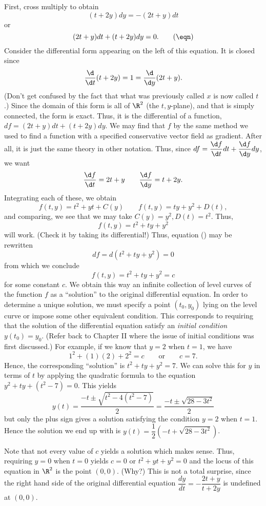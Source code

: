 First, cross multiply to obtain
$$
  (t + 2y)dy = -(2t + y)dt
$$
or
\nexteqn
$$
  (2t + y)dt + (t + 2y)dy = 0.\tag\eqn
$$
Consider the differential form appearing on the left of this
equation.  It is closed since
$$
\frac{\d}{\d t} (t + 2y) = 1 = \frac{\d}{\d y}(2t + y).
$$
(Don't get confused by the fact that what was previously called
$x$ is now called $t$.)  Since the domain of this form is all
of $\R^2$ (the $t,y$-plane), and that is simply connected, the form
is exact.  Thus, it is the differential of a function,
 $df = (2t + y)dt + (t + 2y)dy$.  We may find that
$f$ by the same method we used to find a function 
with a specified 
 conservative vector field as gradient.  After all, it is just
the same theory in other notation.  Thus, since
$df = \dfrac{\d f}{\d t}dt + \dfrac{\d f}{\d y} dy$,
we want
$$
\frac{\d f}{\d t} = 2t + y\qquad\frac{\d f}{\d y} = t + 2y.
$$
Integrating each of these, we obtain
$$
f(t,y) = t^2 + yt + C(y)\qquad f(t,y) =  ty + y^2 + D(t),
$$
and comparing, we see that we may take $C(y) = y^2, D(t) = t^2$.
Thus,
$$
f(t,y) = t^2 + ty + y^2 
$$
will work.  (Check it by taking its differential!)
Thus, equation (\eqn) may be rewritten
$$
df = d (t^2 + ty + y^2) = 0
$$
from which we conclude
$$
  f(t,y) = t^2 + ty + y^2 = c
$$
for some constant $c$. 
We obtain this way an infinite collection
of level curves of the function $f$ as a ``solution'' to
the original differential equation.  In order to determine a
unique solution, we must specify a point $(t_0, y_0)$ lying
on the level curve or impose some other equivalent condition.
This corresponds to requiring that the solution of the differential
equation satisfy an {\it initial condition}  $y(t_0) = y_0$.
(Refer back to Chapter II where the issue of initial conditions
was first discussed.)   For example, if we know that
$y = 2$ when $t = 1$, we have
$$
   1^2 + (1)(2) + 2^2 = c\qquad\text{or}\qquad c = 7.
$$
Hence, the corresponding ``solution'' is $t^2 + ty + y^2 = 7$.
We can solve this for $y$ in terms of $t$ by applying the quadratic formula
to the equation $y^2 + ty + (t^2 - 7) = 0$.  This yields
$$
  y(t) = \frac{ -t \pm \sqrt{t^2 -4(t^2 - 7)}}2  = 
\frac{ -t \pm \sqrt{28 - 3t^2}}2
$$
but only the plus sign gives a solution satisfying the condition
$y = 2$ when $t = 1$.  Hence the solution we end up with
is  $y(t) = \dfrac 12(-t + \sqrt{28 - 3t^2})$.

Note that not every value of $c$ yields a solution which makes
sense.  Thus, requiring $y = 0$ when $t = 0$ yields $c = 0$
or $t^2 + yt + y^2 = 0$ and the locus of this equation in
$\R^2$ is the point $(0,0)$.  (Why?)   This is not a total
surprise, since the right hand side of the  original
differential equation $\dfrac{dy}{dt} = -\dfrac{2t+y}{t +2y}$
is undefined at $(0,0)$.

